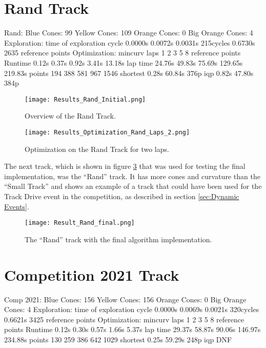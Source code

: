 \section{Rand Track} \label{sec:Results Rand Track}
Rand:
Blue Cones: 99
Yellow Cones: 109
Orange Cones: 0
Big Orange Cones: 4
Exploration:
time of exploration cycle
0.0000s 0.0072s 0.0031s 215cycles 0.6730s
2635 reference points
Optimization:
mincurv laps 1 2 3 5 8
reference points
Runtime 0.12s 0.37s 0.92s 3.41s 13.18s
lap time 24.76s 49.83s 75.69s 129.65s 219.83s
points 194 388 581 967 1546
shortest 0.28s 60.84s 376p
iqp 0.82s 47.80s 384p

\begin{figure}[H]
    \centering
    \texttt{[image: Results\_Rand\_Initial.png]}
    \caption{Overview of the Rand Track.}
    \label{fig:Results Rand Initial}
\end{figure}

\begin{figure}[H]
    \centering
    \texttt{[image: Results\_Optimization\_Rand\_Laps\_2.png]}
    \caption{Optimization on the Rand Track for two laps.}
    \label{fig:Results Rand Laps 2}
\end{figure}

The next track, which is shown in figure \ref{fig:Result Rand Final} that was used for testing the final implementation, was the ``Rand'' track. It has more cones and curvature than the ``Small Track'' and shows an example of a track that could have been used for the Track Drive event in the competition, as described in section \ref{sec:Dynamic Events}.
\begin{figure}[H]
    \centering
    \texttt{[image: Result\_Rand\_final.png]}
    \caption{The ``Rand'' track with the final algorithm implementation.}
    \label{fig:Result Rand Final}
\end{figure}

\section{Competition 2021 Track} \label{sec:Results Competition 2021 Track}
Comp 2021:
Blue Cones: 156
Yellow Cones: 156
Orange Cones: 0
Big Orange Cones: 4
Exploration:
time of exploration cycle
0.0000s 0.0069s 0.0021s 320cycles 0.6621s
3425 reference points
Optimization:
mincurv laps 1 2 3 5 8
reference points
Runtime 0.12s 0.30s 0.57s 1.66s 5.37s
lap time 29.37s 58.87s 90.06s 146.97s 234.88s
points 130 259 386 642 1029
shortest 0.25s 59.29s 248p
iqp DNF

